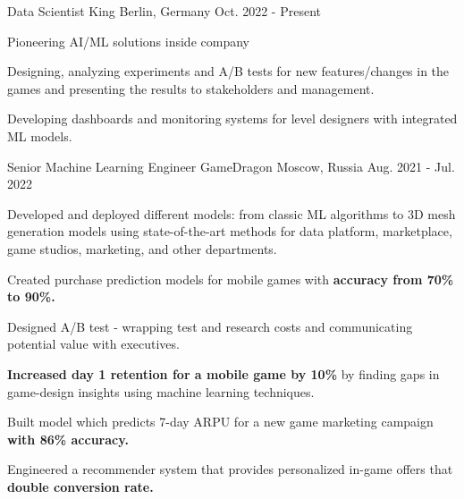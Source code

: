 

\begin{cventries}
  \cventry
    {Data Scientist} %
    {King} %
    {Berlin, Germany} %
    {Oct. 2022 - Present} %
    {
      \begin{cvitems} %
        \item {Pioneering AI/ML solutions inside company}
        \item {Designing, analyzing  experiments and A/B tests for new features/changes in the games and presenting the results to stakeholders and management.}
        \item {Developing dashboards and monitoring systems for level designers with integrated ML models.}
      \end{cvitems}
    }

  \cventry
    {Senior Machine Learning Engineer} %
    {GameDragon} %
    {Moscow, Russia} %
    {Aug. 2021 - Jul. 2022} %
    {
      \begin{cvitems} %
        \item {Developed and deployed different models: from classic ML algorithms to 3D mesh generation models using state-of-the-art methods for data platform, marketplace, game studios, marketing, and other departments.}
        \item {Created purchase prediction models for mobile games with \textbf{accuracy from 70\% to 90\%.}}
        \item {Designed A/B test - wrapping test and research costs and communicating potential value with executives.}
        \item {\textbf{Increased day 1 retention for a mobile game by 10\%} by finding gaps in game-design insights using machine learning techniques.}
        \item {Built model which predicts 7-day ARPU for a new game marketing campaign \textbf{with 86\% accuracy.}}
        \item {Engineered a recommender system that provides personalized in-game offers that \textbf{double conversion rate.}}
      \end{cvitems}
    }


\end{cventries}
